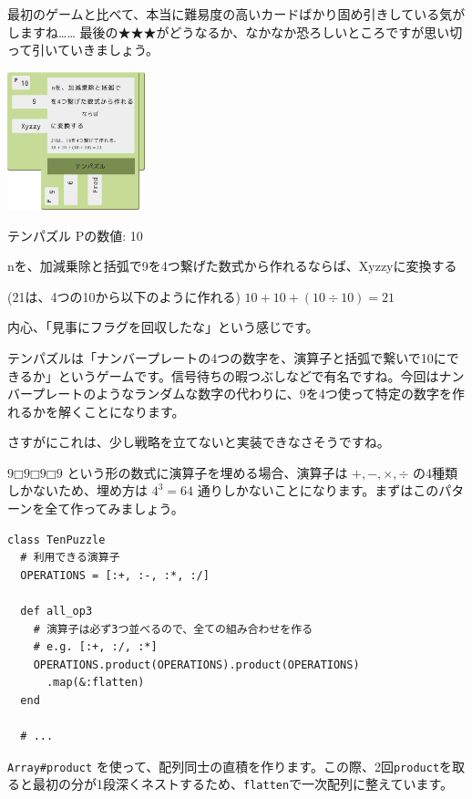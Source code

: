 \documentclass[index]{subfiles}
\begin{document}
最初のゲームと比べて、本当に難易度の高いカードばかり固め引きしている気がしますね…… 最後の★★★がどうなるか、なかなか恐ろしいところですが思い切って引いていきましょう。
  
\begin{center}
  \includegraphics[height=4cm]{image/217_replay_2_7.png}
\end{center}

\begin{itembox}[l]{テンパズル}
Pの数値: 10

nを、加減乗除と括弧で9を4つ繋げた数式から作れるならば、Xyzzyに変換する

(21は、4つの10から以下のように作れる)
$10 + 10 + (10 ÷ 10) = 21$
\end{itembox}

内心、「見事にフラグを回収したな」という感じです。

テンパズルは「ナンバープレートの4つの数字を、演算子と括弧で繋いで10にできるか」というゲームです。信号待ちの暇つぶしなどで有名ですね。今回はナンバープレートのようなランダムな数字の代わりに、9を4つ使って特定の数字を作れるかを解くことになります。

さすがにこれは、少し戦略を立てないと実装できなさそうですね。

$9 □ 9 □ 9 □ 9$ という形の数式に演算子を埋める場合、演算子は $+, -, \times, \div$ の4種類しかないため、埋め方は $4^3 = 64$ 通りしかないことになります。まずはこのパターンを全て作ってみましょう。

\begin{lstlisting}
class TenPuzzle
  # 利用できる演算子
  OPERATIONS = [:+, :-, :*, :/]
  
  def all_op3
    # 演算子は必ず3つ並べるので、全ての組み合わせを作る
    # e.g. [:+, :/, :*]
    OPERATIONS.product(OPERATIONS).product(OPERATIONS)
      .map(&:flatten)
  end

  # ...
\end{lstlisting}

\verb+Array#product+ を使って、配列同士の直積を作ります。この際、2回\verb+product+を取ると最初の分が1段深くネストするため、\verb+flatten+で一次配列に整えています。
\end{document}

